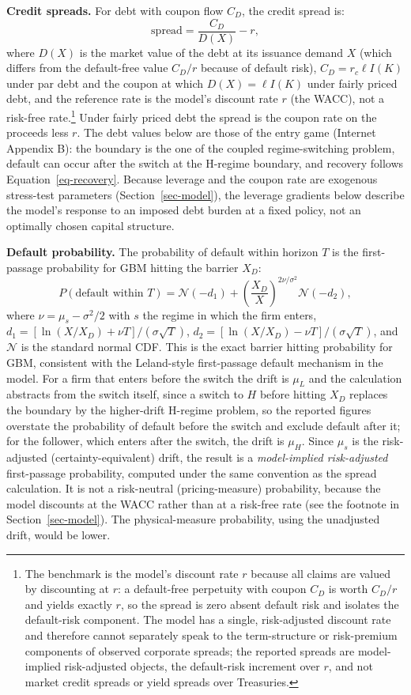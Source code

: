 \documentclass[
  11pt,
  letterpaper,
]{scrartcl}
\begin{document}
\textbf{Credit spreads.} For debt with coupon flow \(C_D\), the credit
spread is: \[
\text{spread} = \frac{C_D}{D(X)} - r,
\] where \(D(X)\) is the market value of the debt at its issuance demand
\(X\) (which differs from the default-free value \(C_D/r\) because of
default risk), \(C_D = r_c \ell I(K)\) under par debt and the coupon at
which \(D(X) = \ell I(K)\) under fairly priced debt, and the reference
rate is the model's discount rate \(r\) (the WACC), not a risk-free
rate.\footnote{The benchmark is the model's discount rate \(r\) because
  all claims are valued by discounting at \(r\): a default-free
  perpetuity with coupon \(C_D\) is worth \(C_D/r\) and yields exactly
  \(r\), so the spread is zero absent default risk and isolates the
  default-risk component. The model has a single, risk-adjusted discount
  rate and therefore cannot separately speak to the term-structure or
  risk-premium components of observed corporate spreads; the reported
  spreads are model-implied risk-adjusted objects, the default-risk
  increment over \(r\), and not market credit spreads or yield spreads
  over Treasuries.} Under fairly priced debt the spread is the coupon
rate on the proceeds less \(r\). The debt values below are those of the
entry game (Internet Appendix B): the boundary is the one of the coupled
regime-switching problem, default can occur after the switch at the
H-regime boundary, and recovery follows Equation~\ref{eq-recovery}.
Because leverage and the coupon rate are exogenous stress-test
parameters (Section~\ref{sec-model}), the leverage gradients below
describe the model's response to an imposed debt burden at a fixed
policy, not an optimally chosen capital structure.

\textbf{Default probability.} The probability of default within horizon
\(T\) is the first-passage probability for GBM hitting the barrier
\(X_D\): \[
P(\text{default within } T) = \mathcal{N}(-d_1) + \left(\frac{X_D}{X}\right)^{2\nu/\sigma^2} \mathcal{N}(-d_2),
\] where \(\nu = \mu_s - \sigma^2/2\) with \(s\) the regime in which the
firm enters, \(d_1 = [\ln(X/X_D) + \nu T]/(\sigma\sqrt{T})\),
\(d_2 = [\ln(X/X_D) - \nu T]/(\sigma\sqrt{T})\), and \(\mathcal{N}\) is
the standard normal CDF. This is the exact barrier hitting probability
for GBM, consistent with the Leland-style first-passage default
mechanism in the model. For a firm that enters before the switch the
drift is \(\mu_L\) and the calculation abstracts from the switch itself,
since a switch to \(H\) before hitting \(X_D\) replaces the boundary by
the higher-drift H-regime problem, so the reported figures overstate the
probability of default before the switch and exclude default after it;
for the follower, which enters after the switch, the drift is \(\mu_H\).
Since \(\mu_s\) is the risk-adjusted (certainty-equivalent) drift, the
result is a \emph{model-implied risk-adjusted} first-passage
probability, computed under the same convention as the spread
calculation. It is not a risk-neutral (pricing-measure) probability,
because the model discounts at the WACC rather than at a risk-free rate
(see the footnote in Section~\ref{sec-model}). The physical-measure
probability, using the unadjusted drift, would be lower.
\end{document}
